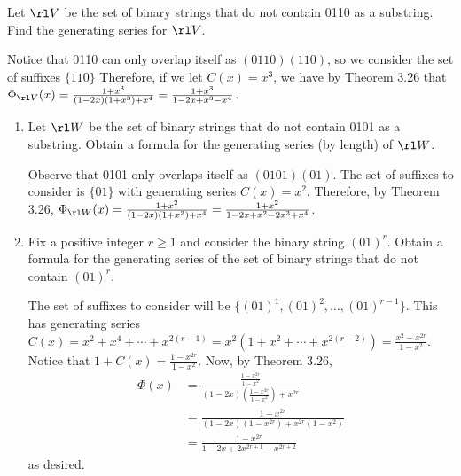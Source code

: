 \begin{xca}
  Let $\rl V$ be the set of binary strings that do not contain 0110 as a substring.
  Find the generating series for $\rl V$.
\end{xca}
\begin{sol}
  Notice that 0110 can only overlap itself as $(0110)(110)$,
  so we consider the set of suffixes $\{110\}$
  Therefore, if we let $C(x) = x^3$, we have by Theorem 3.26 that
  $\Phi_{\rl V}(x) = \frac{1+x^3}{(1-2x)(1+x^3)+x^4} = \frac{1+x^3}{1-2x+x^3-x^4}$.
\end{sol}

\begin{xca}\end{xca}
\begin{enumerate}
  \item Let $\rl W$ be the set of binary strings that do not contain 0101 as a substring.
        Obtain a formula for the generating series (by length) of $\rl W$.
        \begin{sol}
          Observe that 0101 only overlaps itself as $(0101)(01)$.
          The set of suffixes to consider is $\{01\}$
          with generating series $C(x) = x^2$.
          Therefore, by Theorem 3.26,
          $\Phi_{\rl W}(x) = \frac{1+x^2}{(1-2x)(1+x^2)+x^4} = \frac{1+x^2}{1-2x+x^2-2x^3+x^4}$.
        \end{sol}
  \item Fix a positive integer $r \geq 1$ and consider the binary string $(01)^r$.
        Obtain a formula for the generating series
        of the set of binary strings that do not contain $(01)^r$.
        \begin{sol}
          The set of suffixes to consider will be $\{(01)^1,(01)^2,\dotsc,(01)^{r-1}\}$.
          This has generating series $C(x) = x^2 + x^4 + \dotsb + x^{2(r-1)}
            = x^2(1+x^2+\dotsb+x^{2(r-2)}) = \frac{x^2-x^{2r}}{1-x^2}$.
          Notice that $1+C(x) = \frac{1-x^{2r}}{1-x^2}$.
          Now, by Theorem 3.26,
          \begin{align*}
            \Phi(x) & = \frac{\frac{1-x^{2r}}{1-x^2}}{(1-2x)(\frac{1-x^{2r}}{1-x^2})+x^{2r}} \\
                    & = \frac{1-x^{2r}}{(1-2x)(1-x^{2r})+x^{2r}(1-x^2)}                      \\
                    & = \frac{1-x^{2r}}{1-2x+2x^{2r+1}-x^{2r+2}}
          \end{align*}
          as desired.
        \end{sol}
\end{enumerate}

